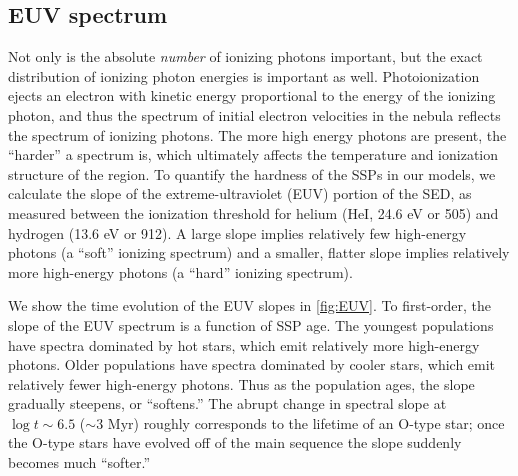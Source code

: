 \subsection{EUV spectrum}\label{sec:spectra:EUV}

Not only is the absolute \emph{number} of ionizing photons important, but the exact distribution of ionizing photon energies is important as well. Photoionization ejects an electron with kinetic energy proportional to the energy of the ionizing photon, and thus the spectrum of initial electron velocities in the nebula reflects the spectrum of ionizing photons. The more high energy photons are present, the ``harder'' a spectrum is, which ultimately affects the temperature and ionization structure of the \hii region. To quantify the hardness of the SSPs in our models, we calculate the slope of the extreme-ultraviolet (EUV) portion of the SED, as measured between the ionization threshold for helium (HeI, 24.6 eV or 505\ang{}) and hydrogen (13.6 eV or 912\ang{}). A large slope implies relatively few high-energy photons (a ``soft'' ionizing spectrum) and a smaller, flatter slope implies relatively more high-energy photons (a ``hard'' ionizing spectrum). 

We show the time evolution of the EUV slopes in \ref{fig:EUV}. To first-order, the slope of the EUV spectrum is a function of SSP age. The youngest populations have spectra dominated by hot stars, which emit relatively more high-energy photons. Older populations have spectra dominated by cooler stars, which emit relatively fewer high-energy photons. Thus as the population ages, the slope gradually steepens, or ``softens.'' The abrupt change in spectral slope at $\log t \sim 6.5$ ($\sim 3$ Myr) roughly corresponds to the lifetime of an O-type star; once the O-type stars have evolved off of the main sequence the slope suddenly becomes much ``softer.''

